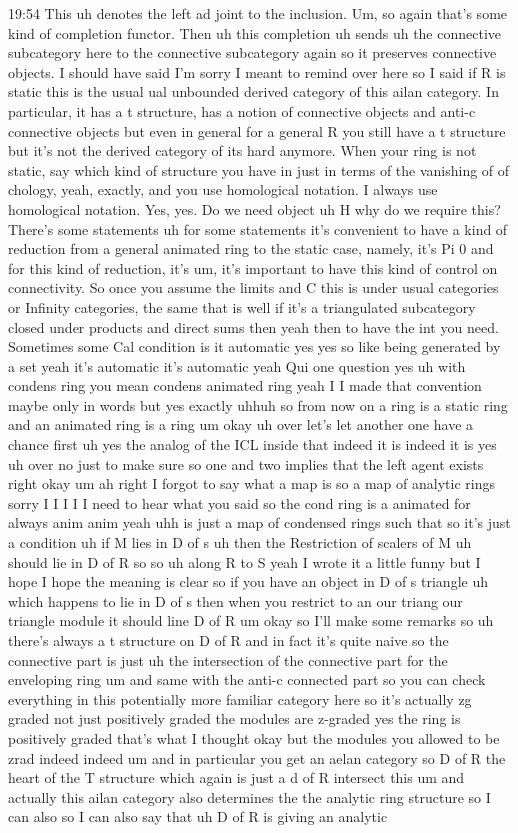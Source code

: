 \begin{unfinished}{19:54}
This uh denotes the left ad joint to the inclusion. Um, so again that's some kind of completion functor. Then uh this completion uh sends uh the connective subcategory here to the connective subcategory again so it preserves connective objects. I should have said I'm sorry I meant to remind over here so I said if R is static this is the usual ual unbounded derived category of this ailan category. In particular, it has a t structure, has a notion of connective objects and anti-c connective objects but even in general for a general R you still have a t structure but it's not the derived category of its hard anymore. When your ring is not static, say which kind of structure you have in just in terms of the vanishing of of chology, yeah, exactly, and you use homological notation. I always use homological notation. Yes, yes. Do we need object uh H why do we require this? There's some statements uh for some statements it's convenient to have a kind of reduction from a general animated ring to the static case, namely, it's Pi 0 and for this kind of reduction, it's um, it's important to have this kind of control on connectivity. So once you assume the limits and C this is under usual categories or Infinity categories, the same that is well if it's a triangulated subcategory closed under products and direct sums then yeah then to have the int you need. Sometimes some Cal condition is it automatic yes yes so like being generated by a set yeah it's automatic it's automatic yeah Qui one question yes uh with condens ring you mean condens animated ring yeah I I made that convention maybe only in words but yes exactly uhhuh so from now on a ring is a static ring and an animated ring is a ring um okay uh over let's let another one have a chance first uh yes the analog of the ICL inside that indeed it is indeed it is yes uh over no just to make sure so one and two implies that the left agent exists right okay um ah right I forgot to say what a map is so a map of analytic rings sorry I I I I I need to hear what you said so the cond ring is a animated for always anim anim yeah uhh is just a map of condensed rings such that so it's just a condition uh if M lies in D of s uh then the Restriction of scalers of M uh should lie in D of R so so uh along R to S yeah I wrote it a little funny but I hope I hope the meaning is clear so if you have an object in D of s triangle uh which happens to lie in D of s then when you restrict to an our triang our triangle module it should line D of R um okay so I'll make some remarks so uh there's always a t structure on D of R and in fact it's quite naive so the connective part is just uh the intersection of the connective part for the enveloping ring um and same with the anti-c connected part so you can check everything in this potentially more familiar category here so it's actually zg graded not just positively graded the modules are z-graded yes the ring is positively graded that's what I thought okay but the modules you allowed to be zrad indeed indeed um and in particular you get an aelan category so D of R the heart of the T structure which again is just a d of R intersect this um and actually this ailan category also determines the the analytic ring structure so I can also so I can also say that uh D of R is giving an analytic 
\end{unfinished}
